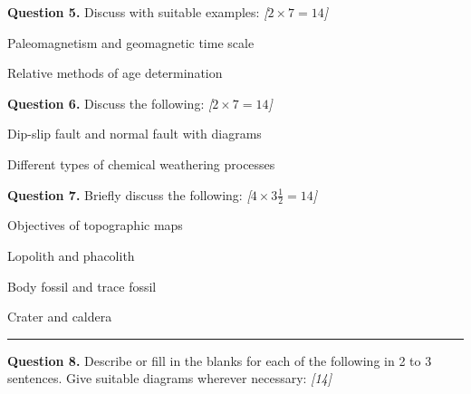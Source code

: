 \documentclass[11pt,a4paper]{article}
\newcommand{\pts}[1]{\hfill   \textit{[#1]}}
\begin{document}
\medskip


\noindent   \textbf{Question 5.} Discuss with suitable examples: \pts{$2  \times 7 = 14$}

\begin{parts}
  \item Paleomagnetism and geomagnetic time scale
  \item Relative methods of age determination
\end{parts}

\medskip


\noindent   \textbf{Question 6.} Discuss the following: \pts{$2  \times 7 = 14$}

\begin{parts}
  \item Dip-slip fault and normal fault with diagrams
  \item Different types of chemical weathering processes
\end{parts}

\medskip


\noindent   \textbf{Question 7.} Briefly discuss the following: \pts{$4  \times 3\frac{1}{2} = 14$}

\begin{parts}
  \item Objectives of topographic maps
  \item Lopolith and phacolith
  \item Body fossil and trace fossil
  \item Crater and caldera
\end{parts}

\bigskip


\rule{\linewidth}{0.4pt}\smallskip




\noindent   \textbf{Question 8.} Describe or fill in the blanks for each of the following in 2 to 3 sentences. Give suitable diagrams wherever necessary: \pts{14}
\end{document}
